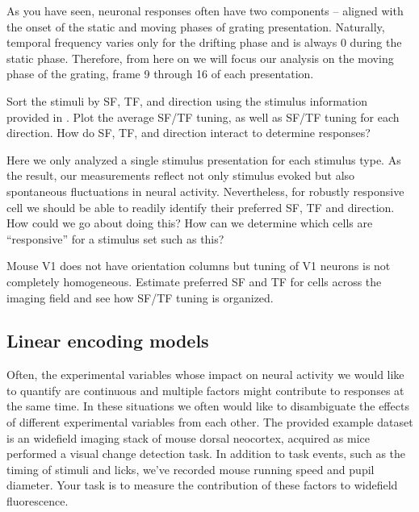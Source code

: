 \documentclass[a4paper]{report}
\newcommand{\nexercise}[0]{\arabic{exercises}\addtocounter{exercises}{1}}
\begin{document}
As you have seen, neuronal responses often have two components -- aligned with the onset of the static and moving phases of grating presentation. 
Naturally, temporal frequency varies only for the drifting phase and is always 0 during the static phase.
Therefore, from here on we will focus our analysis on the moving phase of the grating, frame 9 through 16 of each presentation.

\begin{exercisebox}[frametitle={Exercise \nexercise: Spatial and temporal frequency tuning}]
Sort the stimuli by SF, TF, and direction using the stimulus information provided in \texttt{}. 
Plot the average SF/TF tuning, as well as SF/TF tuning for each direction. 
How do SF, TF, and direction interact to determine responses?
\end{exercisebox}

Here we only analyzed a single stimulus presentation for each stimulus type. 
As the result, our measurements reflect not only stimulus evoked but also spontaneous fluctuations in neural activity.
Nevertheless, for robustly responsive cell we should be able to readily identify their preferred SF, TF and direction. 
How could we go about doing this? 
How can we determine which cells are ``responsive'' for a stimulus set such as this?

\begin{exercisebox}[frametitle={Exercise \nexercise: Spatial distribution of tuning preferences in V1}]
Mouse V1 does not have orientation columns but tuning of V1 neurons is not completely homogeneous. 
Estimate preferred SF and TF for cells across the imaging field and see how SF/TF tuning is organized.
\end{exercisebox}

\subsection{Linear encoding models}
Often, the experimental variables whose impact on neural activity we would like to quantify are continuous and multiple factors might contribute to responses at the same time. 
In these situations we often would like to disambiguate the effects of different experimental variables from each other. 
The provided example dataset is an widefield imaging stack of mouse dorsal neocortex, acquired as mice performed a visual change detection task.
In addition to task events, such as the timing of stimuli and licks, we've recorded mouse running speed and pupil diameter. 
Your task is to measure the contribution of these factors to widefield fluorescence.
\end{document}
